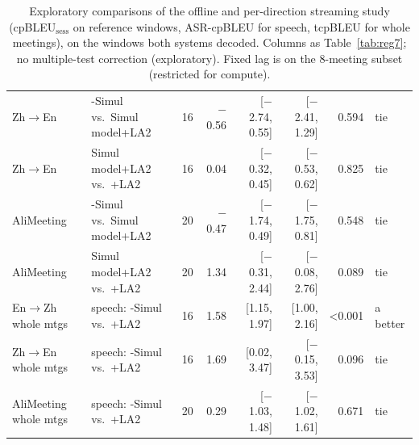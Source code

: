 \begin{table}[t]
{\begin{tabular}{llrrrrrl}
Zh$\rightarrow$En & \sys{}-Simul vs.\ Simul model+LA2 & 16 & $-$0.56 & [$-$2.74, 0.55] & [$-$2.41, 1.29] & 0.594 & tie \\
Zh$\rightarrow$En & Simul model+LA2 vs.\ \sys{}+LA2 & 16 & 0.04 & [$-$0.32, 0.45] & [$-$0.53, 0.62] & 0.825 & tie \\
AliMeeting & \sys{}-Simul vs.\ Simul model+LA2 & 20 & $-$0.47 & [$-$1.74, 0.49] & [$-$1.75, 0.81] & 0.548 & tie \\
AliMeeting & Simul model+LA2 vs.\ \sys{}+LA2 & 20 & 1.34 & [$-$0.31, 2.44] & [$-$0.08, 2.76] & 0.089 & tie \\
En$\rightarrow$Zh whole mtgs & speech: \sys{}-Simul vs.\ \sys{}+LA2 & 16 & 1.58 & [1.15, 1.97] & [1.00, 2.16] & {<}0.001 & a better \\
Zh$\rightarrow$En whole mtgs & speech: \sys{}-Simul vs.\ \sys{}+LA2 & 16 & 1.69 & [0.02, 3.47] & [$-$0.15, 3.53] & 0.096 & tie \\
AliMeeting whole mtgs & speech: \sys{}-Simul vs.\ \sys{}+LA2 & 20 & 0.29 & [$-$1.03, 1.48] & [$-$1.02, 1.61] & 0.671 & tie \\
\bottomrule
\end{tabular}}
\caption{Exploratory comparisons of the offline and per-direction streaming study (cpBLEU$_\text{sess}$ on reference windows, ASR-cpBLEU for speech, tcpBLEU for whole meetings), on the windows both systems decoded. Columns as Table~\ref{tab:reg7}; no multiple-test correction (exploratory). Fixed lag is on the 8-meeting subset (restricted for compute).}
\label{tab:sig7}
\end{table}
